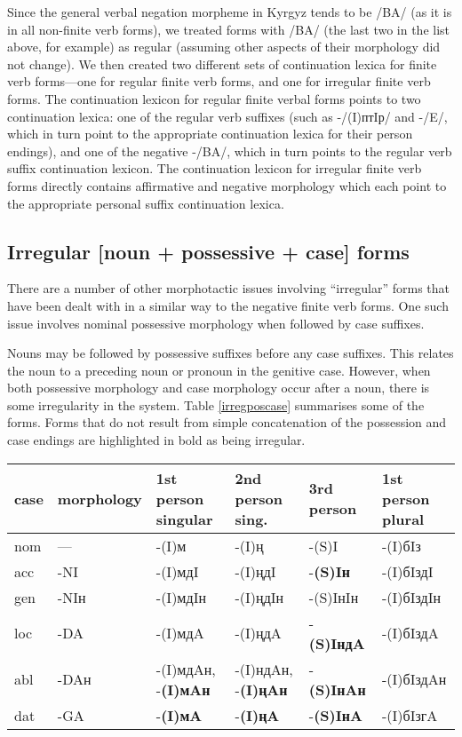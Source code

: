 \documentclass[10pt,a4paper,twocolumn]{article}
\begin{document}
Since the general verbal negation morpheme in Kyrgyz tends to be /BA/ (as it is in all non-finite verb forms), we treated forms with /BA/ (the last two in the list above, for example) as regular (assuming other aspects of their morphology did not change).  We then created two different sets of continuation lexica for finite verb forms—one for regular finite verb forms, and one for irregular finite verb forms.  The continuation lexicon for regular finite verbal forms points to two continuation lexica: one of the regular verb suffixes (such as -/(I)птIр/ and -/E/, which in turn point to the appropriate continuation lexica for their person endings), and one of the negative -/BA/, which in turn points to the regular verb suffix continuation lexicon.  The continuation lexicon for irregular finite verb forms directly contains affirmative and negative morphology which each point to the appropriate personal suffix continuation lexica.

\subsection{Irregular [noun + possessive + case] forms}

There are a number of other morphotactic issues involving ``irregular'' forms that have been dealt with in a similar way to the negative finite verb forms.  One such issue involves nominal possessive morphology when followed by case suffixes.

Nouns may be followed by possessive suffixes before any case suffixes.  This relates the noun to a preceding noun or pronoun in the genitive case.  However, when both possessive morphology and case morphology occur after a noun, there is some irregularity in the system.  Table \ref{irregposcase} summarises some of the forms.  Forms that do not result from simple concatenation of the possession and case endings are highlighted in bold as being irregular.

\begin{table*}[htbp]
	\caption{Combinations of possessive suffixes with case suffixes}\label{irregposcase}
	\centering
	\begin{tabular}{llllll}
		\toprule
		case & morphology & 1st person singular & 2nd person sing. & 3rd person & 1st person plural \\
		\midrule
		nom & — & -(I)м & -(I)ң & -(S)I & -(I)бIз \\
		acc & -NI & -(I)мдI & -(I)ңдI & -\textbf{(S)Iн} & -(I)бIздI \\
		gen & -NIн & -(I)мдIн & -(I)ңдIн & -(S)IнIн & -(I)бIздIн \\
		loc & -DA & -(I)мдA & -(I)ңдA & -\textbf{(S)IндA} & -(I)бIздA \\
		abl & -DAн & -(I)мдAн, -\textbf{(I)мAн} & -(I)ндAн, -\textbf{(I)ңAн} & -\textbf{(S)IнAн} & -(I)бIздAн \\
		dat & -GA & -\textbf{(I)мA} & -\textbf{(I)ңA} & -\textbf{(S)IнA} & -(I)бIзгA \\
		\bottomrule
	\end{tabular}
\end{table*}
\end{document}
